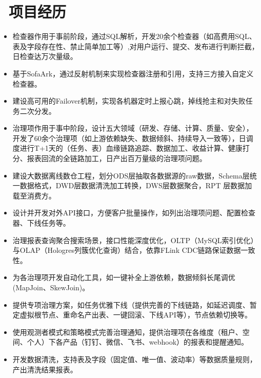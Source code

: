 \documentclass{resume}
\begin{document}
\section{\faUsers\ 项目经历}
\vspace{-0.5ex}
\begin{onehalfspacing}
\begin{itemize}
  \item 检查器作用于事前阶段，通过SQL解析，开发20余个检查器（如高费用SQL、表及字段存在性、禁止简单加工等）,对用户运行、提交、发布进行判断拦截，日检查达万次量级。
  \item 基于SofaArk，通过反射机制来实现检查器注册和引用，支持三方接入自定义检查器。
  \item 建设高可用的Failover机制，实现各机器定时上报心跳，掉线抢主和对失败任务二次分发。
\end{itemize}
\end{onehalfspacing}

\vspace{-1.5ex}

\vspace{-0.5ex}
\begin{onehalfspacing}
\begin{itemize}
  \item 治理项作用于事中阶段，设计五大领域（研发、存储、计算、质量、安全），开发了60余个治理项（如上游依赖缺失、数据倾斜、持续导入一致等），日调度进行T+1天的（任务、表）血缘链路追踪、数据加工、收益计算、健康打分、报表回流的全链路加工，日产出百万量级的治理项问题。
  \item 建设大数据离线数仓工程，划分ODS层抽取各数据源的raw数据，Schema层统一数据格式，DWD层数据清洗加工转换，DWS层数据聚合，RPT
层数据加载至消费方。
  \item 设计并开发对外API接口，方便客户批量操作，如列出治理项问题、配置检查器、下线任务等。
\end{itemize}
\end{onehalfspacing}

\vspace{-0.5ex}
\begin{onehalfspacing}
\begin{itemize}
  \item 治理报表查询聚合搜索场景，接口性能深度优化，OLTP（MySQL索引优化）与OLAP（Hologres列簇优化查询）结合，依靠FLink CDC链路保证数据一致性。
  \item 为各治理项开发自动化工具，如一键补全上游依赖，数据倾斜长尾调优(MapJoin、SkewJoin)。
  \item 提供专项治理方案，如任务优雅下线（提供完善的下线链路，如延迟调度、暂定虚拟根节点、重命名产出表、一键回滚、下线API等），节点依赖切换等。
  \item 使用观测者模式和策略模式完善治理通知，提供治理项在各维度（租户、空间、个人）下各产品（钉钉、微信、飞书、webhook）的报表和提醒通知。
  \item 开发数据清洗，支持表及字段（固定值、唯一值、波动率）等数据质量规则，产出清洗结果报表。
\end{itemize}
\end{onehalfspacing}
\end{document}
